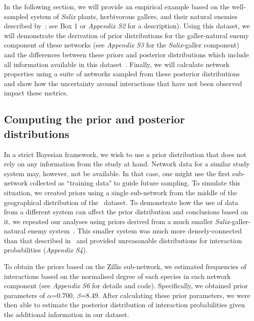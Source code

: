 \documentclass[12pt]{article}
\begin{document}
\begin{spacing}{2.0}
    In the following section, we will provide an empirical example based on the well-sampled system of \emph{Salix} plants, herbivorous gallers, and their natural enemies described by~\citet{Kopelke2017}; see Box 1 or \emph{Appendix S2} for a description). Using this dataset, we will demonstrate the derivation of prior distributions for the galler-natural enemy component of these networks (see \emph{Appendix S3} for the \emph{Salix}-galler component) and the differences between these priors and posterior distributions which include all information available in this dataset~\citep{Kopelke2017}. Finally, we will calculate network properties using a suite of networks sampled from these posterior distributions and show how the uncertainty around interactions that have not been observed impact these metrics. 


  \subsection*{Computing the prior and posterior distributions}

      In a strict Bayesian framework, we wish to use a prior distribution that does not rely on any information from the study at hand. Network data for a similar study system may, however, not be available. In that case, one might use the first sub-network collected as ``training data" to guide future sampling. To simulate this situation, we created priors using a single sub-network from the middle of the geographical distribution of the~\citet{Kopelke2017} dataset. To demonstrate how the use of data from a different system can affect the prior distribution and conclusions based on it, we repeated our analyses using priors derived from a much smaller \emph{Salix}-galler-natural enemy system~\citep[Data available from the Dryad Digital Repository: https://doi.org/10.5061/dryad.g7805]{Barbour2016}\nocite{Barbour2016Dryad}. This smaller system was much more densely-connected than that described in~\citet{Kopelke2017} and provided unreasonable distributions for interaction probabilities (\emph{Appendix S4}). 


      To obtain the priors based on the Zillis sub-network, we estimated frequencies of interactions based on the normalised degree of each species in each network component
      (see \emph{Appendix S6} for details and code). Specifically, we obtained prior parameters of $\alpha$=0.700, $\beta$=8.49. After calculating these prior parameters, we were then able to estimate the posterior distribution of interaction probabilities given the additional information in our dataset.
  


\end{spacing}
\end{document}
